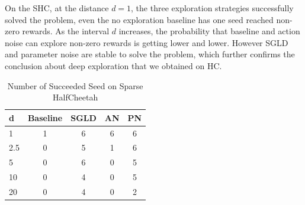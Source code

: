 On the SHC, at the distance $d=1$, the three exploration strategies successfully solved the problem, even the no exploration baseline has one seed reached non-zero rewards. As the interval $d$ increases, the probability that baseline and action noise can explore non-zero rewards is getting lower and lower. However SGLD and parameter noise are stable to solve the problem, which further confirms the conclusion about deep exploration that we obtained on HC.

\begin{table}[htbp]
   \caption{Number of Succeeded Seed on Sparse HalfCheetah}
   \label{tab:shc}
   \vskip 0.15in
   \begin{center}
   \begin{tabular}{lcccc}
   \toprule
       d    & Baseline & SGLD & AN & PN \\
   \midrule
      1     & 1        & 6    & 6  & 6 \\
      2.5   & 0        & 5    & 1  & 6 \\
      5     & 0        & 6    & 0  & 5 \\
      10    & 0        & 4    & 0  & 5 \\
      20    & 0        & 4    & 0  & 2 \\
   \bottomrule
   \end{tabular}
   \end{center}
   \vskip -0.1in
\end{table}

